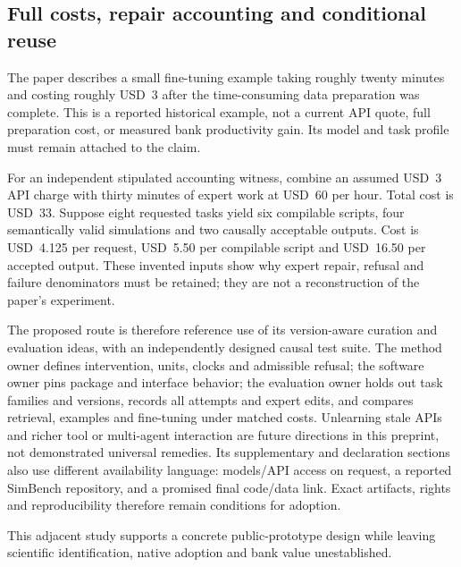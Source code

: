 \subsection{Full costs, repair accounting and conditional reuse}
The paper describes a small fine-tuning example taking roughly twenty minutes
and costing roughly USD~3 after the time-consuming data preparation was
complete. This is a reported historical example, not a current API quote,
full preparation cost, or measured bank productivity gain. Its model and task
profile must remain attached to the claim.~\citep{exec24_chronollm_original}

For an independent stipulated accounting witness, combine an assumed USD~3
API charge with thirty minutes of expert work at USD~60 per hour. Total cost
is USD~33. Suppose eight requested tasks yield six compilable scripts, four
semantically valid simulations and two causally acceptable outputs. Cost is
USD~4.125 per request, USD~5.50 per compilable script and USD~16.50 per
accepted output. These invented inputs show why expert repair, refusal and
failure denominators must be retained; they are not a reconstruction of the
paper's experiment.~\citep{exec24_chronollm_reference}

The proposed route is therefore reference use of its version-aware curation
and evaluation ideas, with an independently designed causal test suite.
The method owner defines intervention, units, clocks and admissible refusal;
the software owner pins package and interface behavior; the evaluation owner
holds out task families and versions, records all attempts and expert edits,
and compares retrieval, examples and fine-tuning under matched costs.
Unlearning stale APIs and richer tool or multi-agent interaction are future
directions in this preprint, not demonstrated universal remedies. Its
supplementary and declaration sections also use different availability
language: models/API access on request, a reported SimBench repository, and
a promised final code/data link. Exact artifacts, rights and reproducibility
therefore remain conditions for adoption.~\citep{exec24_chronollm_original}

This adjacent study supports a concrete public-prototype design while leaving
scientific identification, native adoption and bank value unestablished.
